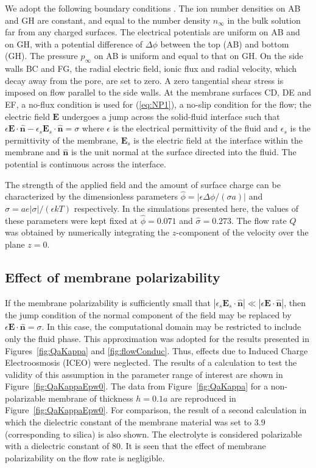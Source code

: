 We adopt the following boundary conditions \cite{Mao2013}. The ion number densities on AB and GH are constant, and equal to the number density $n_\infty$ in the bulk solution far from any charged surfaces. The electrical potentials are uniform on AB and on GH, with a potential difference of $\Delta\phi$ between the top (AB) and bottom (GH). The pressure $p_{\infty}$ on AB is uniform and equal to that on GH. On the side walls BC and FG, the radial electric field, ionic flux and radial velocity, which decay away from the pore, are set to zero. A zero tangential shear stress is imposed on flow parallel to the side walls. At the membrane surfaces CD, DE and EF, a no-flux condition is used for 
(\ref{eq:NP1}), a no-slip condition for the flow; the electric field $\mathbf{E}$ undergoes a jump across the solid-fluid interface such that
$\epsilon \mathbf{E} \cdot  \hat{\mathbf{n}} - \epsilon_{s} \mathbf{E}_{s} \cdot \hat{\mathbf{n}} = \sigma$ 
where $\epsilon$ is the electrical permittivity of the
fluid and $\epsilon_{s}$ is the permittivity of the membrane, $\mathbf{E}_{s}$ is the electric field 
at the interface within the membrane and $\hat{\mathbf{n}}$ is the unit normal at the surface directed 
into the fluid. The potential is continuous across the interface. 

The strength of the applied field and the amount of surface charge can be characterized 
by the dimensionless parameters $\hat{\phi} = |\epsilon \Delta \phi/(\sigma a)|$ and 
$\hat{\sigma} = a e |\sigma | / (\epsilon kT)$ respectively. In the simulations presented here, 
the values of these parameters were kept fixed at $\hat{\phi}=0.071$ and $\hat{\sigma} = 0.273$.
The flow rate $Q$ was obtained by numerically integrating the $z$-component of the velocity over the plane $z=0$.

\subsection{Effect of membrane polarizability}
If the membrane polarizability is sufficiently small that
$|\epsilon_{s} \mathbf{E}_{s} \cdot \hat{\mathbf{n}}|\ll|\epsilon \mathbf{E} \cdot  \hat{\mathbf{n}}|$, then the jump condition of the normal component of the field may be replaced by
 $\epsilon \mathbf{E} \cdot \hat{\mathbf{n}} = \sigma$. 
In this case, the computational domain may be restricted to include only the fluid phase. This approximation was adopted for the results presented in Figures~\ref{fig:QaKappa} and
\ref{fig:flowConduc}.
Thus, effects due to Induced Charge Electroosmosis (ICEO) were neglected. 
The results of a calculation to test the validity of this assumption in the parameter range 
of interest are shown in Figure~\ref{fig:QaKappaEpw0}. The data from Figure~\ref{fig:QaKappa} for a non-polarizable membrane of thickness $h = 0.1a$ are reproduced in Figure~\ref{fig:QaKappaEpw0}. 
 For comparison, the result of a second calculation in which the dielectric constant of 
the membrane material was set to $3.9$ (corresponding to silica) is also shown. The electrolyte 
is considered polarizable with a dielectric constant of $80$. It is seen that 
the effect of membrane polarizability on the flow rate is negligible.

